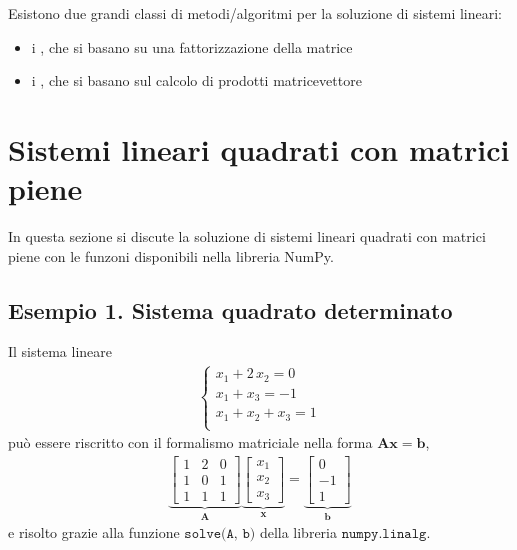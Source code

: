 \documentclass[letterpaper,10pt,italian]{jupyterBook}
\begin{document}
\sphinxAtStartPar
{} Esistono due grandi classi di metodi/algoritmi per la soluzione di sistemi lineari:
\begin{itemize}
\item {} 
\sphinxAtStartPar
i , che si basano su una fattorizzazione della matrice

\item {} 
\sphinxAtStartPar
i , che si basano sul calcolo di prodotti matrice\sphinxhyphen{}vettore

\end{itemize}


\section{Sistemi lineari quadrati con matrici piene}
\label{\detokenize{ch/numerics/linear:sistemi-lineari-quadrati-con-matrici-piene}}
\sphinxAtStartPar
In questa sezione si discute la soluzione di sistemi lineari quadrati con matrici piene con le funzoni disponibili nella libreria NumPy.


\subsection{Esempio 1. Sistema quadrato determinato}
\label{\detokenize{ch/numerics/linear:esempio-1-sistema-quadrato-determinato}}
\sphinxAtStartPar
Il sistema lineare
\begin{equation*}
\begin{split}\begin{cases}
  x_1 + 2 \, x_2 = 0 \\
  x_1 + x_3 = -1 \\
  x_1 + x_2 + x_3 = 1 \\
\end{cases}\end{split}
\end{equation*}
\sphinxAtStartPar
può essere riscritto con il formalismo matriciale nella forma \(\mathbf{A} \mathbf{x} = \mathbf{b}\),
\begin{equation*}
\begin{split}
\underbrace{\begin{bmatrix} 1 & 2 & 0 \\ 1 & 0 & 1 \\ 1 & 1 & 1 \end{bmatrix}}_{\mathbf{A}}
\underbrace{\begin{bmatrix} x_1 \\ x_2 \\ x_3 \end{bmatrix}}_{\mathbf{x}} =
\underbrace{\begin{bmatrix} 0 \\ -1 \\ 1 \end{bmatrix}}_{\mathbf{b}}
\end{split}
\end{equation*}
\sphinxAtStartPar
e risolto grazie alla funzione \(\texttt{solve(A, b)}\) della libreria \(\texttt{numpy.linalg}\).
\end{document}
